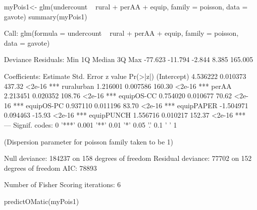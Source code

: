\begin{Schunk}
\begin{Sinput}
 myPois1<- glm(undercount ~ rural + perAA + equip, family = poisson, data = gavote)
 summary(myPois1) 
\end{Sinput}
\begin{Soutput}
Call:
glm(formula = undercount ~ rural + perAA + equip, family = poisson, 
    data = gavote)

Deviance Residuals: 
    Min       1Q   Median       3Q      Max  
-77.623  -11.794   -2.844    8.385  165.005  

Coefficients:
             Estimate Std. Error z value Pr(>|z|)    
(Intercept)  4.536222   0.010373  437.32   <2e-16 ***
ruralurban   1.216001   0.007586  160.30   <2e-16 ***
perAA        2.213451   0.020352  108.76   <2e-16 ***
equipOS-CC   0.754020   0.010677   70.62   <2e-16 ***
equipOS-PC   0.937110   0.011196   83.70   <2e-16 ***
equipPAPER  -1.504971   0.094463  -15.93   <2e-16 ***
equipPUNCH   1.556716   0.010217  152.37   <2e-16 ***
---
Signif. codes:  0 '***' 0.001 '**' 0.01 '*' 0.05 '.' 0.1 ' ' 1

(Dispersion parameter for poisson family taken to be 1)

    Null deviance: 184237  on 158  degrees of freedom
Residual deviance:  77702  on 152  degrees of freedom
AIC: 78893

Number of Fisher Scoring iterations: 6
\end{Soutput}
\begin{Sinput}
 predictOMatic(myPois1)
\end{Sinput}
\end{Schunk}
